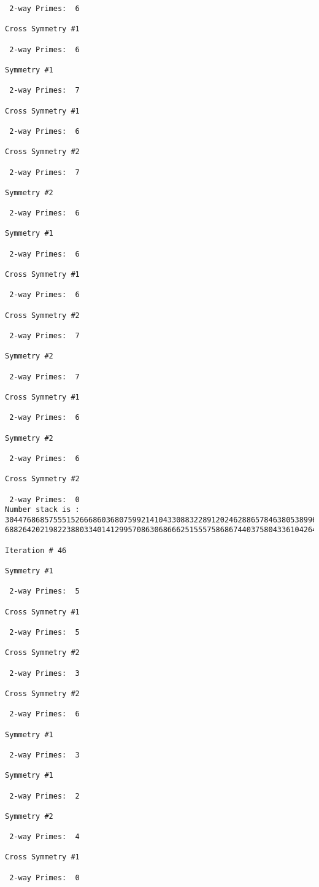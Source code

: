 \begin{verbatim}
 2-way Primes: 	6

Cross Symmetry #1

 2-way Primes: 	6

Symmetry #1

 2-way Primes: 	7

Cross Symmetry #1

 2-way Primes: 	6

Cross Symmetry #2

 2-way Primes: 	7

Symmetry #2

 2-way Primes: 	6

Symmetry #1

 2-way Primes: 	6

Cross Symmetry #1

 2-way Primes: 	6

Cross Symmetry #2

 2-way Primes: 	7

Symmetry #2

 2-way Primes: 	7

Cross Symmetry #1

 2-way Primes: 	6

Symmetry #2

 2-way Primes: 	6

Cross Symmetry #2

 2-way Primes: 	0
Number stack is :
30447686857555152666860368075992141043308832289120246288657846380538996794608835958544046240163340857
68826420219822388033401412995708630686662515557586867440375804336104264044585953880649769983508364875

Iteration #	46

Symmetry #1

 2-way Primes: 	5

Cross Symmetry #1

 2-way Primes: 	5

Cross Symmetry #2

 2-way Primes: 	3

Cross Symmetry #2

 2-way Primes: 	6

Symmetry #1

 2-way Primes: 	3

Symmetry #1

 2-way Primes: 	2

Symmetry #2

 2-way Primes: 	4

Cross Symmetry #1

 2-way Primes: 	0


\end{verbatim}
